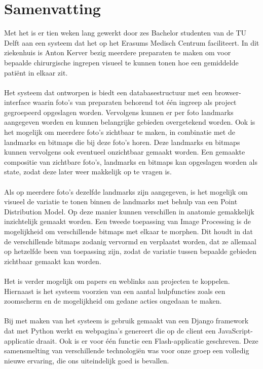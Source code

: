 \chapter{Samenvatting}

Met het \casamproject is er tien weken lang gewerkt door zes Bachelor studenten van de TU Delft aan een 
systeem dat het \casamproject op het Erasums Medisch Centrum faciliteert. 
In dit ziekenhuis is Anton Kerver bezig meerdere preparaten te maken om voor bepaalde chirurgische ingrepen visueel te kunnen tonen hoe een gemiddelde pati\"{e}nt in elkaar zit.
\\
\\
Het systeem dat ontworpen is biedt een databasestructuur met een browser-interface waarin foto's van 
preparaten behorend tot \'{e}\'{e}n ingreep als project gegroepeerd opgeslagen worden. 
Vervolgens kunnen er per foto landmarks aangegeven worden en kunnen belangrijke gebieden overgetekend worden.
Ook is het mogelijk om meerdere foto's zichtbaar te maken, in combinatie met de landmarks en bitmaps die bij deze foto's horen.
Deze landmarks en bitmaps kunnen vervolgens ook eventueel onzichtbaar gemaakt worden.
Een gemaakte compositie van zichtbare foto's, landmarks en bitmaps kan opgeslagen worden als state, zodat deze later weer makkelijk op te vragen is.
\\
\\
Als op meerdere foto's dezelfde landmarks zijn aangegeven, is het mogelijk om visueel de variatie te tonen binnen de landmarks met behulp van een Point Distribution Model. 
Op deze manier kunnen verschillen in anatomie gemakkelijk inzichtelijk gemaakt worden.
Een tweede toepassing van Image Processing is de mogelijkheid om verschillende bitmaps met elkaar te morphen. 
Dit houdt in dat de verschillende bitmaps zodanig vervormd en verplaatst worden, dat ze allemaal op hetzelfde been van toepassing zijn,
zodat de variatie tussen bepaalde gebieden zichtbaar gemaakt kan worden.
\\
\\
Het is verder mogelijk om papers en weblinks aan projecten te koppelen.
Hiernaast is het systeem voorzien van een aantal hulpfuncties zoals een zoomscherm en de mogelijkheid om gedane acties ongedaan te maken. 
\\
\\
Bij met maken van het systeem is gebruik gemaakt van een Django framework dat met Python werkt en webpagina's genereert die op de client een JavaScript-applicatie draait. 
Ook is er voor \'{e}\'{e}n functie een Flash-applicatie geschreven.
Deze samensmelting van verschillende technologi\"{e}n was voor onze groep een volledig nieuwe ervaring, die 
ons uiteindelijk goed is bevallen.
